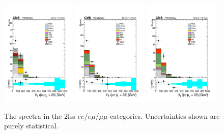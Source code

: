 \begin{figure}[htp]
\centering
\includegraphics[width=0.32\textwidth]{ch5_figs/ht_ttH_ee_stackPlot_SR.pdf}
\includegraphics[width=0.32\textwidth]{ch5_figs/ht_ttH_em_stackPlot_SR.pdf}
\includegraphics[width=0.32\textwidth]{ch5_figs/ht_ttH_mm_stackPlot_SR.pdf} \\
\caption[Data/MC comparison of the \ht spectra in the signal region]{The \ht spectra in the 2lss $ee$/$e\mu$/$\mu\mu$ categories. Uncertainties shown are purely statistical.}
\label{fig:sr_ht}
\end{figure}

